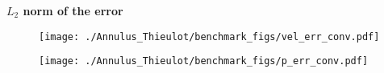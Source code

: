 \documentclass[12pt]{article}
\numberwithin{equation}{subsection}
\begin{document}
\begin{figure*}[!htb]
\end{figure*}

\newpage
\textbf{$L_{2}$ norm of the error}
\begin{figure*}[!htb]
		\begin{multicols}{1}
				\hspace{3.0in} \texttt{[image: ./Annulus\_Thieulot/benchmark\_figs/vel\_err\_conv.pdf]}
		\end{multicols}
		
		\begin{multicols}{1}
			\hspace{3.0in} \texttt{[image: ./Annulus\_Thieulot/benchmark\_figs/p\_err\_conv.pdf]}
		\end{multicols}
\end{figure*}
\end{document}
